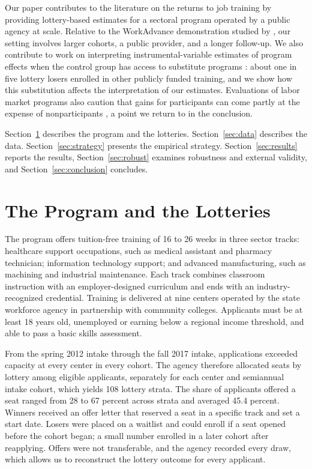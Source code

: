 \documentclass[12pt]{article}
\begin{document}
Our paper contributes to the literature on the returns to job training \citep{lalonde1986,heckman1999,card2018} by providing lottery-based estimates for a sectoral program operated by a public agency at scale. Relative to the WorkAdvance demonstration studied by \citet{katz2022}, our setting involves larger cohorts, a public provider, and a longer follow-up. We also contribute to work on interpreting instrumental-variable estimates of program effects when the control group has access to substitute programs \citep{klinewalters2016}: about one in five lottery losers enrolled in other publicly funded training, and we show how this substitution affects the interpretation of our estimates. Evaluations of labor market programs also caution that gains for participants can come partly at the expense of nonparticipants \citep{crepon2013}, a point we return to in the conclusion.

Section~\ref{sec:program} describes the program and the lotteries. Section~\ref{sec:data} describes the data. Section~\ref{sec:strategy} presents the empirical strategy. Section~\ref{sec:results} reports the results, Section~\ref{sec:robust} examines robustness and external validity, and Section~\ref{sec:conclusion} concludes.

\section{The Program and the Lotteries}\label{sec:program}

The program offers tuition-free training of 16 to 26 weeks in three sector tracks: healthcare support occupations, such as medical assistant and pharmacy technician; information technology support; and advanced manufacturing, such as machining and industrial maintenance. Each track combines classroom instruction with an employer-designed curriculum and ends with an industry-recognized credential. Training is delivered at nine centers operated by the state workforce agency in partnership with community colleges. Applicants must be at least 18 years old, unemployed or earning below a regional income threshold, and able to pass a basic skills assessment.

From the spring 2012 intake through the fall 2017 intake, applications exceeded capacity at every center in every cohort. The agency therefore allocated seats by lottery among eligible applicants, separately for each center and semiannual intake cohort, which yields 108 lottery strata. The share of applicants offered a seat ranged from 28 to 67 percent across strata and averaged 45.4 percent. Winners received an offer letter that reserved a seat in a specific track and set a start date. Losers were placed on a waitlist and could enroll if a seat opened before the cohort began; a small number enrolled in a later cohort after reapplying. Offers were not transferable, and the agency recorded every draw, which allows us to reconstruct the lottery outcome for every applicant.
\end{document}
